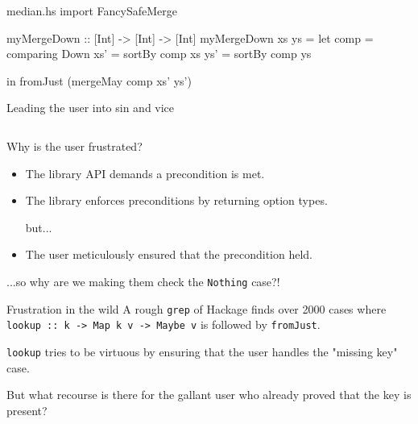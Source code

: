 \documentclass{beamer}
\begin{document}
\begin{filecontents*}{median.hs}
import FancySafeMerge

myMergeDown :: [Int] -> [Int] -> [Int]
myMergeDown xs ys =
    let comp = comparing Down
        xs' = sortBy  comp xs
        ys' = sortBy  comp ys

    in  fromJust (mergeMay comp xs' ys')
\end{filecontents*}
\begin{frame}{Leading the user into sin and vice}
\inputminted{haskell}{median.hs}
\end{frame}

\begin{frame}{Why is the user frustrated?}
  \begin{itemize}
    \pause\item The library API demands a precondition is met.
  \pause\item The library enforces preconditions by returning option types.
  \pause\\\bigskip

  \qquad\qquad\qquad\qquad but...
  \bigskip

  \pause
\item The user meticulously ensured that the precondition held.
  \end{itemize}
  \pause...so why are we making them check the \texttt{Nothing} case?!
\end{frame}

\begin{frame}{Frustration in the wild}
  A rough \texttt{grep} of Hackage finds over 2000 cases where \\
  {\scriptsize\texttt{lookup :: k -> Map k v -> Maybe v}} is followed by
  {\scriptsize\texttt{fromJust}}.
  \bigskip
  
  {\scriptsize\texttt{lookup}} tries to be virtuous by ensuring that the user handles the
  "missing key" case.
  \bigskip

  But what recourse is there for the gallant user who
  already proved that the key is present?
\end{frame}
\end{document}
